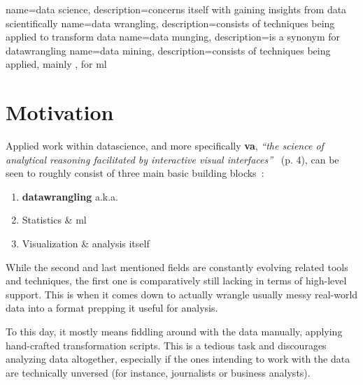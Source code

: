 
{
  name={data science},
  description={concerns itself with gaining insights from data scientifically}
}
{
  name={data wrangling},
  description={consists of techniques being applied to transform data}
}
{
  name={data munging},
  description={is a synonym for \gls{datawrangling}}
}
{
  name={data mining},
  description={consists of techniques being applied, mainly , for \gls{ml}}
}


\section{Motivation}

Applied work within \gls{datascience}, and more specifically \textbf{\gls{va}}, \emph{``the science of
analytical reasoning facilitated by interactive visual interfaces''}~\cite{Thomas2005} (p. 4), can be seen to roughly consist of three main basic building blocks~\cite{Web:DataScience}:
\begin{enumerate}
  \item \textbf{\Gls{datawrangling}} a.k.a. \textbf{}
  \item Statistics \& \Gls{ml}
  \item Visualization \& analysis itself
\end{enumerate}

While the second and last mentioned fields are constantly evolving related tools and techniques, the first one is comparatively still lacking in terms of high-level support.
This is when it comes down to actually wrangle usually messy real-world data into a format prepping it useful for analysis.

To this day, it mostly means fiddling around with the data manually, applying hand-crafted transformation scripts.
This is a tedious task and discourages analyzing data altogether, especially if the ones intending to work with the data are technically unversed (for instance, journalists or business analysts).

